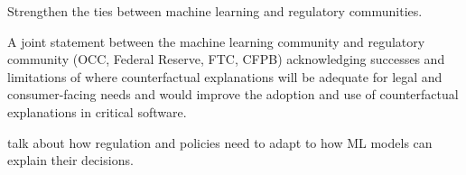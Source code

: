 \begin{challenge}\label{ch:regulatory-colab}
Strengthen the ties between machine learning and regulatory communities. 
\end{challenge}
A joint statement between the machine learning community and regulatory community (OCC, Federal Reserve, FTC, CFPB) acknowledging successes and limitations of where counterfactual explanations will be adequate for legal and consumer-facing needs and would improve the adoption and use of counterfactual explanations in critical software. 

\progress
\citet{non-asimov-ai-regulation-paper} talk about how regulation and policies need to adapt to how ML models can explain their decisions. 
